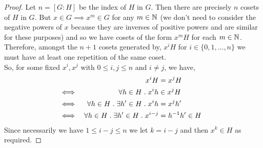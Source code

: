 \documentclass[MathsNotesBase.tex]{subfiles}
\begin{document}
{	\medskip
	\begin{proof}
		Let ${ n = [G : H] }$ be the index of $H$ in $G$. Then there are precisely $n$ cosets of $H$ in $G$. But ${ x \in G \implies x^m \in G }$ for any ${ m \in \mathbb{N}^{} }$ (we don't need to consider the negative powers of $x$ because they are inverses of positive powers and are similar for these purposes) and so we have cosets of the form ${ x^mH }$ for each ${ m \in \mathbb{N}^{} }$. Therefore, amongst the ${ n+1 }$ cosets generated by, ${ x^iH }$ for ${ i \in \{0,1,\dots, n\} }$ we must have at least one repetition of the same coset.\\
			So, for some fixed ${ x^i, x^j }$ with ${ 0 \leq i,j \leq n }$ and ${ i \neq j }$, we have,
			\begin{align*}
			&& x^iH &= x^jH & \\
			&\iff & \forall h \in H \;.\; x^ih &\in x^jH & \\
			&\iff & \forall h \in H \;.\; \exists h' \in H \;.\; x^ih &= x^jh' &\text{\scriptsize{}} \\
			&\iff & \forall h \in H \;.\; \exists h' \in H \;.\; x^{i-j} &= {h}^{-1}h' \in H &\text{\scriptsize{}} \\
			\end{align*}
		Since necessarily we have ${ 1 \leq i-j \leq n }$ we let ${ k = i-j }$ and then ${ x^k \in H }$ as required.
	\end{proof}

}
\end{document}

